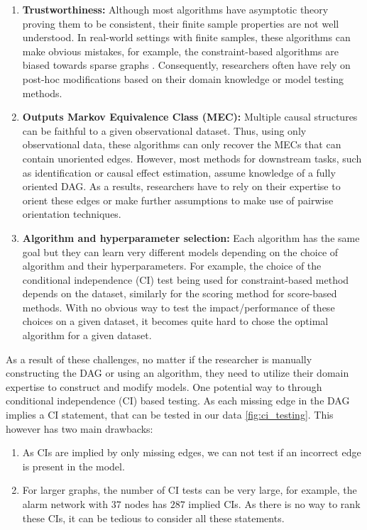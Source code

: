 \documentclass[letterpaper]{article} %
\begin{document}
\begin{enumerate}
	\item \textbf{Trustworthiness: } Although most algorithms have
		asymptotic theory proving them to be consistent, their finite
		sample properties are not well understood. In real-world
		settings with finite samples, these algorithms can make obvious
		mistakes, for example, the constraint-based algorithms are
		biased towards sparse graphs \citep{Malinsky2024}. Consequently,
		researchers often have rely on post-hoc modifications based on 
		their domain knowledge or model testing methods.
	\item \textbf{Outputs Markov Equivalence Class (MEC):} Multiple causal
		structures can be faithful to a given observational dataset.
		Thus, using only observational data, these algorithms can only
		recover the MECs that can contain unoriented edges. However,
		most methods for downstream tasks, such as identification or
		causal effect estimation, assume knowledge of a fully oriented
		DAG. As a results, researchers have to rely on their expertise
		to orient these edges or make further assumptions to make use
		of pairwise orientation techniques.
	\item \textbf{Algorithm and hyperparameter selection:} Each algorithm
		has the same goal but they can learn very different models
		depending on the choice of algorithm and their hyperparameters.
		For example, the choice of the conditional independence (CI)
		test being used for constraint-based method depends on the
		dataset, similarly for the scoring method for score-based
		methods. With no obvious way to test the impact/performance of
		these choices on a given dataset, it becomes quite hard to
		chose the optimal algorithm for a given dataset.
\end{enumerate}

As a result of these challenges, no matter if the researcher is manually
constructing the DAG or using an algorithm, they need to utilize their domain
expertise to construct and modify models. One potential way to through
conditional independence (CI) based testing. As each missing edge in the DAG
implies a CI statement, that can be tested in our data \ref{fig:ci_testing}.
This however has two main drawbacks: 
\begin{enumerate}
	\item As CIs are implied by only missing edges, we can not test if an
		incorrect edge is present in the model.
	\item For larger graphs, the number of CI tests can be very large, for example,
		the alarm network with $ 37 $ nodes has $ 287 $ implied CIs. As
		there is no way to rank these CIs, it can be tedious to
		consider all these statements.
\end{enumerate}
\end{document}
